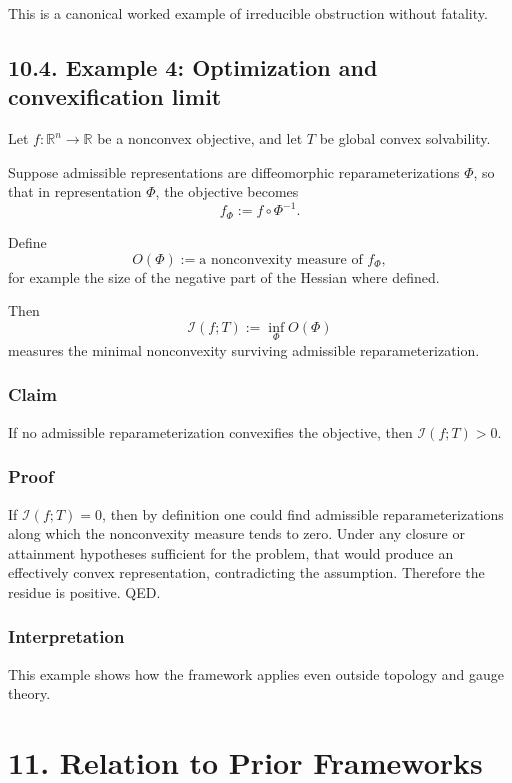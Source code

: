 \documentclass[
]{article}
\begin{document}
This is a canonical worked example of irreducible obstruction without
fatality.

\subsection{10.4. Example 4: Optimization and convexification
limit}\label{example-4-optimization-and-convexification-limit}

Let \(f : \mathbb{R}^n \to \mathbb{R}\) be a nonconvex objective, and
let \(T\) be global convex solvability.

Suppose admissible representations are diffeomorphic reparameterizations
\(\Phi\), so that in representation \(\Phi\), the objective becomes \[
f_\Phi := f \circ \Phi^{-1}.
\]

Define \[
O(\Phi) := \text{a nonconvexity measure of } f_\Phi,
\] for example the size of the negative part of the Hessian where
defined.

Then \[
\mathcal{I}(f;T) := \inf_\Phi O(\Phi)
\] measures the minimal nonconvexity surviving admissible
reparameterization.

\subsubsection{Claim}\label{claim-3}

If no admissible reparameterization convexifies the objective, then
\(\mathcal{I}(f;T) > 0\).

\subsubsection{Proof}\label{proof-10}

If \(\mathcal{I}(f;T) = 0\), then by definition one could find
admissible reparameterizations along which the nonconvexity measure
tends to zero. Under any closure or attainment hypotheses sufficient for
the problem, that would produce an effectively convex representation,
contradicting the assumption. Therefore the residue is positive. QED.

\subsubsection{Interpretation}\label{interpretation-6}

This example shows how the framework applies even outside topology and
gauge theory.

\section{11. Relation to Prior
Frameworks}\label{relation-to-prior-frameworks}
\end{document}
